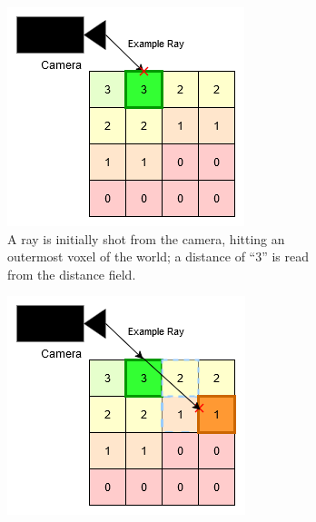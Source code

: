 \begin{figure}[htbp]
    \centering
    \begin{subfigure}[t]{0.32\textwidth}
        \centering
        \includegraphics[width=\textwidth]{figures/df_dda_1.drawio.png}
        \caption{A ray is initially shot from the camera, hitting an outermost voxel of the world; a distance of ``3''
            is read from the distance field.}
    \end{subfigure}
    \hfill
    \begin{subfigure}[t]{0.32\textwidth}
        \centering
        \includegraphics[width=\textwidth]{figures/df_dda_2.drawio.png}

\end{subfigure}
\end{figure}
